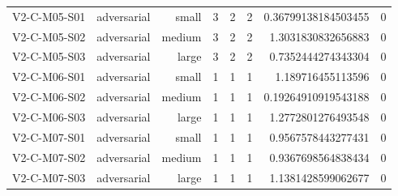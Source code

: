 {\begin{longtable}{lrrrrrrr}
V2-C-M05-S01 & adversarial & small & 3 & 2 & 2 & 0.36799138184503455 & 0 \\
V2-C-M05-S02 & adversarial & medium & 3 & 2 & 2 & 1.3031830832656883 & 0 \\
V2-C-M05-S03 & adversarial & large & 3 & 2 & 2 & 0.7352444274343304 & 0 \\
V2-C-M06-S01 & adversarial & small & 1 & 1 & 1 & 1.189716455113596 & 0 \\
V2-C-M06-S02 & adversarial & medium & 1 & 1 & 1 & 0.19264910919543188 & 0 \\
V2-C-M06-S03 & adversarial & large & 1 & 1 & 1 & 1.2772801276493548 & 0 \\
V2-C-M07-S01 & adversarial & small & 1 & 1 & 1 & 0.9567578443277431 & 0 \\
V2-C-M07-S02 & adversarial & medium & 1 & 1 & 1 & 0.9367698564838434 & 0 \\
V2-C-M07-S03 & adversarial & large & 1 & 1 & 1 & 1.1381428599062677 & 0 \\
\bottomrule
\end{longtable}
}
